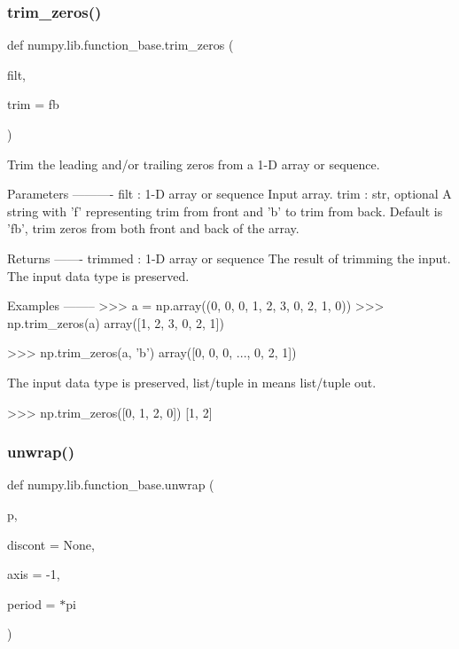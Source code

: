 \mbox{\label{namespacenumpy_1_1lib_1_1function__base_a25cae3cdf5408e8248743303aed46291}} 
\subsubsection{\texorpdfstring{trim\+\_\+zeros()}{trim\_zeros()}}
{\footnotesize\ttfamily def numpy.\+lib.\+function\+\_\+base.\+trim\+\_\+zeros (\begin{DoxyParamCaption}\item[{}]{filt,  }\item[{}]{trim = {\ttfamily \textquotesingle{}fb\textquotesingle{}} }\end{DoxyParamCaption})}

\begin{DoxyVerb}Trim the leading and/or trailing zeros from a 1-D array or sequence.

Parameters
----------
filt : 1-D array or sequence
    Input array.
trim : str, optional
    A string with 'f' representing trim from front and 'b' to trim from
    back. Default is 'fb', trim zeros from both front and back of the
    array.

Returns
-------
trimmed : 1-D array or sequence
    The result of trimming the input. The input data type is preserved.

Examples
--------
>>> a = np.array((0, 0, 0, 1, 2, 3, 0, 2, 1, 0))
>>> np.trim_zeros(a)
array([1, 2, 3, 0, 2, 1])

>>> np.trim_zeros(a, 'b')
array([0, 0, 0, ..., 0, 2, 1])

The input data type is preserved, list/tuple in means list/tuple out.

>>> np.trim_zeros([0, 1, 2, 0])
[1, 2]\end{DoxyVerb}
 \mbox{\label{namespacenumpy_1_1lib_1_1function__base_a4507dc3e7ce566a616df18466d1b5994}} 
\subsubsection{\texorpdfstring{unwrap()}{unwrap()}}
{\footnotesize\ttfamily def numpy.\+lib.\+function\+\_\+base.\+unwrap (\begin{DoxyParamCaption}\item[{}]{p,  }\item[{}]{discont = {\ttfamily None},  }\item[{}]{axis = {\ttfamily -\/1},  }\item[{}]{period = {$\ast$pi} }\end{DoxyParamCaption})}

